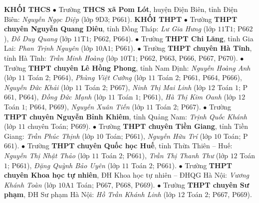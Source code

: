 \begin{multicols}{2}
	\textbf{\color{duongvaotoanhoc}KHỐI THCS}
	\vskip 0.05cm
	$\bullet$ Trường \textbf{\color{duongvaotoanhoc}THCS xã Pom Lót}, huyện Điện Biên, tỉnh Điện Biên: \textit{Nguyễn Ngọc Diệp} (lớp $9$D$3$; P$661$).
	\vskip 0.05cm
	\textbf{\color{duongvaotoanhoc}KHỐI THPT}
	\vskip 0.05cm
	$\bullet$ Trường \textbf{\color{duongvaotoanhoc}THPT chuyên Nguyễn Quang Diêu}, tỉnh Đồng Tháp: \textit{Lư Gia Hưng} (lớp $11$T$1$; P$662$), \textit{Đỗ Duy Quang} (lớp $11$T$1$; P$662$, P$664$).
	\vskip 0.05cm
	$\bullet$ Trường \textbf{\color{duongvaotoanhoc}THPT Chi Lăng}, tỉnh Gia Lai: \textit{Phan Trịnh Nguyên} (lớp $10$A$1$; P$661$).
	\vskip 0.05cm
	$\bullet$ Trường \textbf{\color{duongvaotoanhoc}THPT chuyên Hà Tĩnh}, tỉnh Hà Tĩnh: \textit{Trần Minh Hoàng} (lớp $10$T$1$; P$662$, P$663$, P$666$, P$667$, P$670$).
	\vskip 0.05cm
	$\bullet$ Trường \textbf{\color{duongvaotoanhoc}THPT chuyên Lê Hồng Phong}, tỉnh Nam Định: \textit{Nguyễn Hoàng Anh} (lớp $11$ Toán $2$; P$664$), \textit{Phùng Việt Cường} (lớp $11$ Toán $2$; P$661$, P$664$, P$666$), \textit{Nguyễn Đức Khải} (lớp $11$ Toán $2$; P$667$), \textit{Ninh Thị Mai Linh} (lớp $12$ Toán $1$; P$661$, P$664$), \textit{Đồng Đức Mạnh} (lớp $11$ Toán $1$; P$661$), \textit{Hà Thị Kim Oanh} (lớp $12$ Toán $1$; P$664$, P$669$), \textit{Nguyễn Xuân Tiến} (lớp $11$ Toán $2$; P$667$).
	\vskip 0.05cm
	$\bullet$ Trường \textbf{\color{duongvaotoanhoc}THPT chuyên Nguyễn Bỉnh Khiêm}, tỉnh Quảng Nam: \textit{Trịnh Quốc Khánh} (lớp $11$ chuyên Toán; P$669$).
	\vskip 0.05cm
	$\bullet$ Trường \textbf{\color{duongvaotoanhoc}THPT chuyên Tiền Giang}, tỉnh Tiền Giang: \textit{Trần Phúc Thịnh} (lớp $10$ Toán; P$661$), \textit{Nguyễn Hữu Trí} (lớp $10$ Toán; P$661$).
	\vskip 0.05cm
	$\bullet$ Trường \textbf{\color{duongvaotoanhoc}THPT chuyên Quốc học Huế}, tỉnh Thừa Thiên -- Huế: \textit{Nguyễn Thị Nhật Thảo} (lớp $11$ Toán $2$; P$661$), \textit{Trần Thị Thanh Thư} (lớp $12$ Toán $1$; P$661$), \textit{Đặng Quỳnh Bảo Uyên} (lớp $11$ Toán $2$; P$661$).
	\vskip 0.05cm
	$\bullet$ Trường \textbf{\color{duongvaotoanhoc}THPT chuyên Khoa học tự nhiên}, ĐH Khoa học tự nhiên -- ĐHQG Hà Nội: \textit{Vương Khánh Toàn} (lớp $10$A$1$ Toán; P$667$, P$668$, P$669$).
	\vskip 0.05cm
	$\bullet$ Trường \textbf{\color{duongvaotoanhoc}THPT chuyên Sư phạm}, ĐH Sư phạm Hà Nội: \textit{Hồ Trần Khánh Linh} (lớp $12$ Toán $2$; P$667$, P$669$).
\end{multicols}